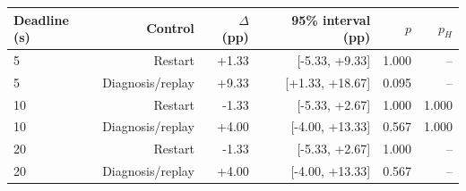 \begin{tabular}{@{}lrrrrr@{}}
\toprule
Deadline (s) & Control & $\Delta$ (pp) & 95\% interval (pp) & $p$ & $p_H$ \\
\midrule
5 & Restart & +1.33 & [-5.33, +9.33] & 1.000 & -- \\
5 & Diagnosis/replay & +9.33 & [+1.33, +18.67] & 0.095 & -- \\
10 & Restart & -1.33 & [-5.33, +2.67] & 1.000 & 1.000 \\
10 & Diagnosis/replay & +4.00 & [-4.00, +13.33] & 0.567 & 1.000 \\
20 & Restart & -1.33 & [-5.33, +2.67] & 1.000 & -- \\
20 & Diagnosis/replay & +4.00 & [-4.00, +13.33] & 0.567 & -- \\
\bottomrule
\end{tabular}
